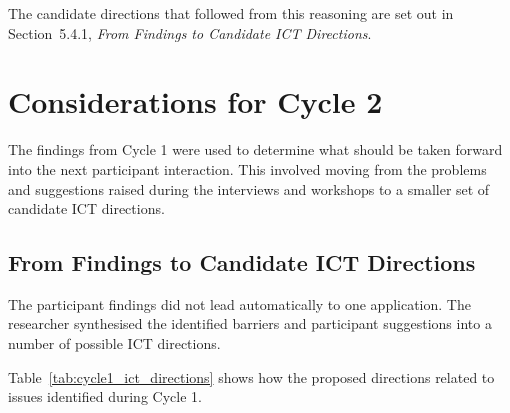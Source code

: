 The candidate directions that followed from this reasoning are set out in Section~5.4.1, \textit{From Findings to Candidate ICT Directions}.

\section{Considerations for Cycle 2}
\label{sec:considerations-cycle2}

The findings from Cycle 1 were used to determine what should be taken forward into the next participant interaction. This involved moving from the problems and suggestions raised during the interviews and workshops to a smaller set of candidate ICT directions.


\subsection{From Findings to Candidate ICT Directions}
\label{sec:candidate-directions}

The participant findings did not lead automatically to one application. The researcher synthesised the identified barriers and participant suggestions into a number of possible ICT directions.

Table~\ref{tab:cycle1_ict_directions} shows how the proposed directions related to issues identified during Cycle 1.

